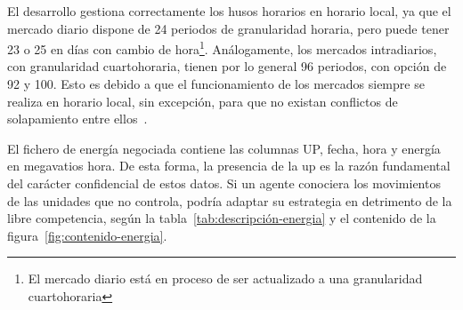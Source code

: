 El desarrollo gestiona correctamente los husos horarios en horario local, ya que el mercado diario dispone de 24 periodos de granularidad horaria, pero puede tener 23 o 25 en días con cambio de hora\footnote{El mercado diario está en proceso de ser actualizado a una granularidad cuartohoraria}. Análogamente, los mercados intradiarios, con granularidad cuartohoraria, tienen por lo general 96 periodos, con opción de 92 y 100. Esto es debido a que el funcionamiento de los mercados siempre se realiza en horario local, sin excepción, para que no existan conflictos de solapamiento entre ellos~\cite{omie2025reglas}.

El fichero de energía negociada contiene las columnas UP, fecha, hora y energía en megavatios hora. De esta forma, la presencia de la \gls{up} es la razón fundamental del carácter confidencial de estos datos. Si un agente conociera los movimientos de las unidades que no controla, podría adaptar su estrategia en detrimento de la libre competencia, según la tabla~\ref{tab:descripción-energia} y el contenido de la figura~\ref{fig:contenido-energia}.

